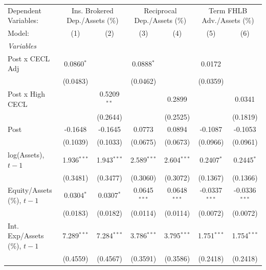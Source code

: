 
\begingroup
\centering
\begin{tabular}{lcccccc}
   \tabularnewline \midrule \midrule
   Dependent Variables: & \multicolumn{2}{c}{Ins. Brokered Dep./Assets (\%)} & \multicolumn{2}{c}{Reciprocal Dep./Assets (\%)} & \multicolumn{2}{c}{Term FHLB Adv./Assets (\%)}\\
   Model:                         & (1)           & (2)           & (3)            & (4)            & (5)             & (6)\\  
   \midrule
   \emph{Variables}\\
   Post x CECL Adj                & 0.0860$^{*}$  &               & 0.0888$^{*}$   &                & 0.0172          &   \\   
                                  & (0.0483)      &               & (0.0462)       &                & (0.0359)        &   \\   
   Post x High CECL               &               & 0.5209$^{**}$ &                & 0.2899         &                 & 0.0341\\   
                                  &               & (0.2644)      &                & (0.2525)       &                 & (0.1819)\\   
   Post                           & -0.1648       & -0.1645       & 0.0773         & 0.0894         & -0.1087         & -0.1053\\   
                                  & (0.1039)      & (0.1033)      & (0.0675)       & (0.0673)       & (0.0966)        & (0.0961)\\   
   log(Assets), $t{-}1$           & 1.936$^{***}$ & 1.943$^{***}$ & 2.589$^{***}$  & 2.604$^{***}$  & 0.2407$^{*}$    & 0.2445$^{*}$\\   
                                  & (0.3481)      & (0.3477)      & (0.3060)       & (0.3072)       & (0.1367)        & (0.1366)\\   
   Equity/Assets (\%), $t{-}1$    & 0.0304$^{*}$  & 0.0307$^{*}$  & 0.0645$^{***}$ & 0.0648$^{***}$ & -0.0337$^{***}$ & -0.0336$^{***}$\\   
                                  & (0.0183)      & (0.0182)      & (0.0114)       & (0.0114)       & (0.0072)        & (0.0072)\\   
   Int. Exp/Assets (\%), $t{-}1$  & 7.289$^{***}$ & 7.284$^{***}$ & 3.786$^{***}$  & 3.795$^{***}$  & 1.751$^{***}$   & 1.754$^{***}$\\   
                                  & (0.4559)      & (0.4567)      & (0.3591)       & (0.3586)       & (0.2418)        & (0.2418)\\   

\end{tabular}
